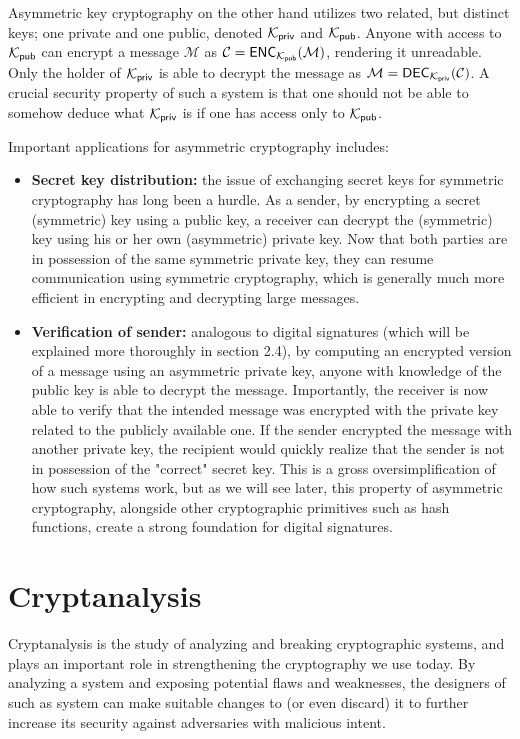 Asymmetric key cryptography on the other hand utilizes two related, but distinct keys; one private and one public, denoted $\mathcal{K}_{\mathsf{priv}}$ and $\mathcal{K}_{\mathsf{pub}}$.
Anyone with access to $\mathcal{K}_{\mathsf{pub}}$ can encrypt a message $\mathcal{M}$ as $\mathcal{C} = \mathsf{ENC}_{\mathcal{K}_{\mathsf{pub}}}(\mathcal{M})$, rendering it unreadable. Only the holder of $\mathcal{K}_{\mathsf{priv}}$ is able to decrypt the message
as $\mathcal{M} = \mathsf{DEC}_{\mathcal{K}_{\mathsf{priv}}}(\mathcal{C})$. A crucial security property of such a system is that one should not be able to somehow deduce what $\mathcal{K}_{\mathsf{priv}}$ is if one has access only to $\mathcal{K}_{\mathsf{pub}}$.

Important applications for asymmetric cryptography includes:
\begin{itemize}
    \item \textbf{Secret key distribution:} the issue of exchanging secret keys for symmetric cryptography has long been a hurdle. As a sender, by encrypting a secret (symmetric) key using a public key,
        a receiver can decrypt the (symmetric) key using his or her own (asymmetric) private key. Now that both parties are in possession of the same symmetric private key, they can resume communication using symmetric cryptography, which
        is generally much more efficient in encrypting and decrypting large messages.
    \item \textbf{Verification of sender:} analogous to digital signatures (which will be explained more thoroughly in section 2.4), by computing an encrypted version of a message using an asymmetric private key, anyone with knowledge of the public key
        is able to decrypt the message. Importantly, the receiver is now able to verify that the intended message was encrypted with the private key related to the publicly available one. If the sender encrypted the message 
        with another private key, the recipient would quickly realize that the sender is not in possession of the "correct" secret key. This is a gross oversimplification of how
        such systems work, but as we will see later, this property of asymmetric cryptography, alongside other cryptographic primitives such as hash functions, create a strong foundation for digital signatures.
\end{itemize}

\section{Cryptanalysis}
Cryptanalysis is the study of analyzing and breaking cryptographic systems, and plays an important role in strengthening the cryptography we use today.
By analyzing a system and exposing potential flaws and weaknesses, the designers of such as system can make suitable changes to (or even discard) it to further increase its security against adversaries with malicious intent.

